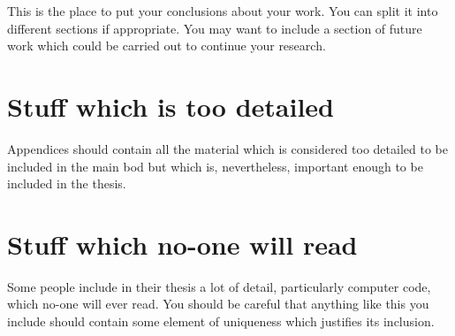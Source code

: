\documentclass[12pt,a4paper]{report}
\begin{document}
This is the place to put your conclusions about your work. You can
split it into different sections if appropriate. You may want to include
a section of future work which could be carried out to continue your
research.

\appendix

\chapter{Stuff which is too detailed}

Appendices should contain all the material which is considered too
detailed to be included in the main bod but which is, nevertheless,
important enough to be included in the thesis.

\chapter{Stuff which no-one will read}

Some people include in their thesis a lot of detail, particularly
computer code, which no-one will ever read. You should be careful that
anything like this you include should contain some element of uniqueness
which justifies its inclusion.



\end{document}
